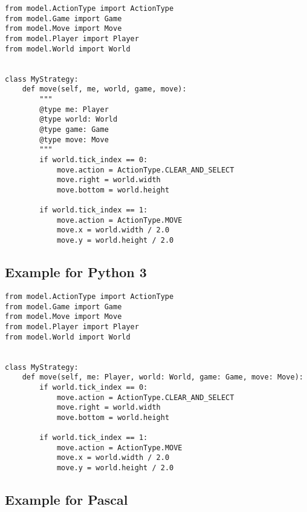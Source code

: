 \begin{verbatim}
from model.ActionType import ActionType
from model.Game import Game
from model.Move import Move
from model.Player import Player
from model.World import World


class MyStrategy:
    def move(self, me, world, game, move):
        """
        @type me: Player
        @type world: World
        @type game: Game
        @type move: Move
        """
        if world.tick_index == 0:
            move.action = ActionType.CLEAR_AND_SELECT
            move.right = world.width
            move.bottom = world.height

        if world.tick_index == 1:
            move.action = ActionType.MOVE
            move.x = world.width / 2.0
            move.y = world.height / 2.0
\end{verbatim}

\subsection{Example for Python 3}

\begin{verbatim}
from model.ActionType import ActionType
from model.Game import Game
from model.Move import Move
from model.Player import Player
from model.World import World


class MyStrategy:
    def move(self, me: Player, world: World, game: Game, move: Move):
        if world.tick_index == 0:
            move.action = ActionType.CLEAR_AND_SELECT
            move.right = world.width
            move.bottom = world.height

        if world.tick_index == 1:
            move.action = ActionType.MOVE
            move.x = world.width / 2.0
            move.y = world.height / 2.0
\end{verbatim}

\newpage
\subsection{Example for Pascal}

